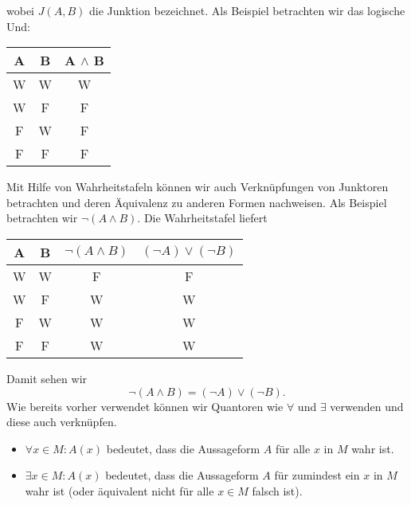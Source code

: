 \documentclass[letterpaper,10pt,english]{jupyterBook}
\begin{document}
wobei \(J(A,B)\) die Junktion bezeichnet. Als Beispiel betrachten wir das logische Und:


\begin{center}
\centering
\begin{tabularx}{\linewidth}[]{|c|c|c|}\hline
 
A
& 
B
& 
A \(\land\) B
\\
\hline
W
&
W
&
W
\\
\hline
W
&
F
&
F
\\
\hline
F
&
W
&
F
\\
\hline
F
&
F
&
F
\\
\hline
\end{tabularx}
\end{center}

Mit Hilfe von Wahrheitstafeln können wir auch Verknüpfungen von Junktoren betrachten und deren Äquivalenz zu anderen Formen nachweisen. Als Beispiel betrachten wir \(\lnot (A \land B)\).
Die Wahrheitstafel liefert


\begin{center}
\centering
\begin{tabularx}{\linewidth}[{\linewidth}]{|c|c|c|c|}\hline
 
A
& 
B
& 
\(\lnot (A \land B)\)
& 
\((\lnot A) \lor (\lnot B)\)
\\
\hline
W
&
W
&
F
&
F
\\
\hline
W
&
F
&
W
&
W
\\
\hline
F
&
W
&
W
&
W
\\
\hline
F
&
F
&
W
&
W
\\
\hline
\end{tabularx}
\end{center}

Damit sehen wir
\begin{equation*}
\lnot (A \land B) = (\lnot A) \lor (\lnot B).
\end{equation*}
Wie bereits vorher verwendet können wir Quantoren wie \(\forall\) und \(\exists\) verwenden und diese auch verknüpfen.
\begin{itemize}
\item {} 
\(\forall x \in M: A(x) \) bedeutet, dass die Aussageform \(A\) für alle \(x\) in \(M\) wahr ist.

\item {} 
\(\exists x \in M: A(x) \) bedeutet, dass die Aussageform \(A\) für zumindest ein \(x\) in \(M\) wahr ist (oder äquivalent nicht für alle \(x \in M\) falsch ist).

\end{itemize}
\end{document}
